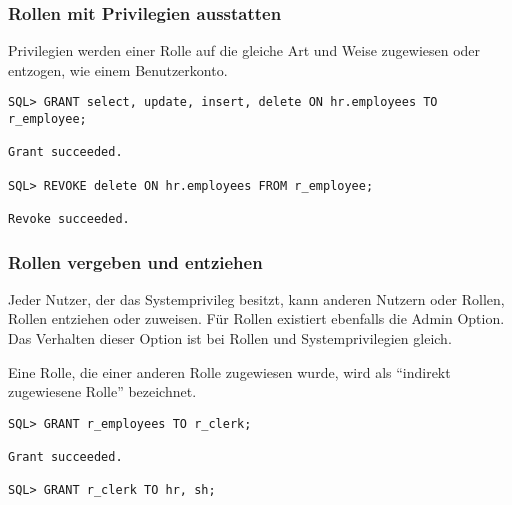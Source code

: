         \subsubsection{Rollen mit Privilegien ausstatten}
          Privilegien werden einer Rolle auf die gleiche Art und Weise zugewiesen oder entzogen, wie einem Benutzerkonto.
          \begin{lstlisting}[caption={Eine Rolle mit Privilegien ausstatten},label=admin249,language=oracle_sql]
SQL> GRANT select, update, insert, delete ON hr.employees TO r_employee;

Grant succeeded.

SQL> REVOKE delete ON hr.employees FROM r_employee;

Revoke succeeded.
          \end{lstlisting}
        \subsubsection{Rollen vergeben und entziehen}
          Jeder Nutzer, der das Systemprivileg 
          besitzt, kann anderen Nutzern oder Rollen, Rollen entziehen oder
          zuweisen. Für Rollen existiert ebenfalls die Admin Option. Das
          Verhalten dieser Option ist bei Rollen und Systemprivilegien gleich.
          \begin{merke}
            Eine Rolle, die einer anderen Rolle zugewiesen wurde, wird als \enquote{indirekt zugewiesene Rolle} bezeichnet.
          \end{merke}
          \begin{lstlisting}[caption={Zuweisen einer Rolle},label=admin250,language=oracle_sql]
SQL> GRANT r_employees TO r_clerk;

Grant succeeded.

SQL> GRANT r_clerk TO hr, sh;
          \end{lstlisting}
